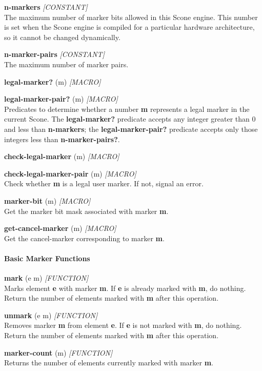 \documentclass[titlepage,twoside,openright,11pt]{article}
\begin{document}
\textbf{n-markers} \emph{{[}CONSTANT{]}}\\
The maximum number of marker bits allowed in this Scone engine. This
number is set when the Scone engine is compiled for a particular
hardware architecture, so it cannot be changed dynamically.

\textbf{n-marker-pairs} \emph{{[}CONSTANT{]}}\\
The maximum number of marker pairs.

\textbf{legal-marker?} (m) \emph{{[}MACRO{]}}

\textbf{legal-marker-pair?} (m) \emph{{[}MACRO{]}}\\
Predicates to determine whether a number \textbf{m} represents a legal
marker in the current Scone. The \textbf{legal-marker?} predicate
accepts any integer greater than 0 and less than \textbf{n-markers}; the
\textbf{legal-marker-pair?} predicate accepts only those integers less
than \textbf{n-marker-pairs?}.

\textbf{check-legal-marker} (m) \emph{{[}MACRO{]}}

\textbf{check-legal-marker-pair} (m) \emph{{[}MACRO{]}}\\
Check whether \textbf{m} is a legal user marker. If not, signal an
error.

\textbf{marker-bit} (m) \emph{{[}MACRO{]}}\\
Get the marker bit mask associated with marker \textbf{m}.

\textbf{get-cancel-marker} (m) \emph{{[}MACRO{]}}\\
Get the cancel-marker corresponding to marker \textbf{m}.

\paragraph{Basic Marker Functions}\label{basic-marker-functions}

\textbf{mark} (e m) \emph{{[}FUNCTION{]}}\\
Marks element \textbf{e} with marker \textbf{m}. If \textbf{e} is
already marked with \textbf{m}, do nothing. Return the number of
elements marked with \textbf{m} after this operation.

\textbf{unmark} (e m) \emph{{[}FUNCTION{]}}\\
Removes marker \textbf{m} from element \textbf{e}. If \textbf{e} is not
marked with \textbf{m}, do nothing. Return the number of elements marked
with \textbf{m} after this operation.

\textbf{marker-count} (m) \emph{{[}FUNCTION{]}\\
}Returns the number of elements currently marked with marker \textbf{m}.
\end{document}
